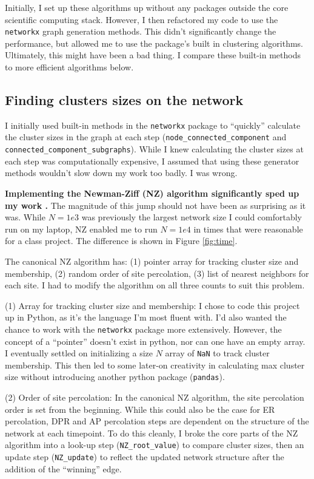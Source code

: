 \documentclass[11pt]{article}   	%
\begin{document}
Initially, I set up these algorithms up without any packages outside the core scientific computing stack. However, I then refactored my code to use the \verb|networkx| graph generation methods. This didn't significantly change the performance, but allowed me to use the package's built in clustering algorithms. Ultimately, this might have been a bad thing. I compare these built-in methods to more efficient algorithms below.

\subsection{Finding clusters sizes on the network}

I initially used built-in methods in the \verb|networkx| package to ``quickly'' calculate the cluster sizes in the graph at each step (\verb|node_connected_component| and \verb|connected_component_subgraphs|). While I knew calculating the cluster sizes at each step was computationally expensive, I assumed that using these generator methods wouldn't slow down my work too badly. I was wrong.

\textbf{Implementing the Newman-Ziff (NZ) algorithm significantly sped up my work \cite{NZ_paper}.} The magnitude of this jump should not have been as surprising as it was. While $N=1e3$ was previously the largest network size I could comfortably run on my laptop, NZ enabled me to run $N=1e4$ in times that were reasonable for a class project. The difference is shown in Figure \ref{fig:time}.

The canonical NZ algorithm has: (1) pointer array for tracking cluster size and membership, (2) random order of site percolation, (3) list of nearest neighbors for each site. I had to modify the algorithm on all three counts to suit this problem. 

(1) Array for tracking cluster size and membership: I chose to code this project up in Python, as it's the language I'm most fluent with. I'd also wanted the chance to work with the \verb|networkx| package more extensively. However, the concept of a ``pointer'' doesn't exist in python, nor can one have an empty array. I eventually settled on initializing a size $N$ array of \verb|NaN| to track cluster membership. This then led to some later-on creativity in calculating max cluster size without introducing another python package (\verb|pandas|).

(2) Order of site percolation: In the canonical NZ algorithm, the site percolation order is set from the beginning. While this could also be the case for ER percolation, DPR and AP percolation steps are dependent on the structure of the network at each timepoint. To do this cleanly, I broke the core parts of the NZ algorithm into a look-up step (\verb|NZ_root_value|) to compare cluster sizes, then an update step (\verb|NZ_update|) to reflect the updated network structure after the addition of the ``winning'' edge. 
\end{document}
